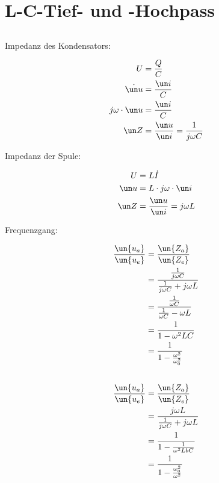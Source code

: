 \documentclass[11pt]{article}
\begin{document}
\section{L-C-Tief- und -Hochpass}
\subsection{}
\begin{adjustwidth}{20pt}{}
    Impedanz des Kondensators:
\end{adjustwidth}
\begin{align*}
    U &= \frac{Q}{C}\\
    \dot {\un u} &= \frac{\un i}{C}\\
    j\omega\cdot {\un u} &= \frac{\un i}{C}\\
    \un Z &= \frac{\un u}{\un i} = \frac{1}{j \omega C}\\
\end{align*}
\begin{adjustwidth}{20pt}{}
    Impedanz der Spule:
\end{adjustwidth}
\begin{align*}
    U &= L \dot I\\
    \un u &= L \cdot j\omega \cdot \un i\\
    \un Z &= \frac{\un u}{\un i} = j\omega L \\
\end{align*}
\begin{adjustwidth}{20pt}{}
    Frequenzgang:
\end{adjustwidth}
\begin{align*}
    \frac{\un {u_a}}{\un {u_e}} &= \frac{\un {Z_a}}{\un {Z_e}}\\
    &= \frac{\frac{1}{j \omega C}}{\frac{1}{j \omega C} + j\omega L}\\
    &= \frac{\frac{1}{\omega C}}{\frac{1}{\omega C} - \omega L}\\
    &= \frac{1}{1 - \omega^2 L C}\\
    &= \frac{1}{1 - \frac{\omega^2}{\omega_0^2}}\\
\end{align*}

\subsection{}
\begin{align*}
    \frac{\un {u_a}}{\un {u_e}} &= \frac{\un {Z_a}}{\un {Z_e}}\\
    &= \frac{j \omega L}{\frac{1}{j \omega C} + j\omega L}\\
    &= \frac{1}{1 - \frac{1}{\omega^2 L bC}}\\
    &= \frac{1}{1 - \frac{\omega_0^2}{\omega^2}}\\
\end{align*}
\end{document}

